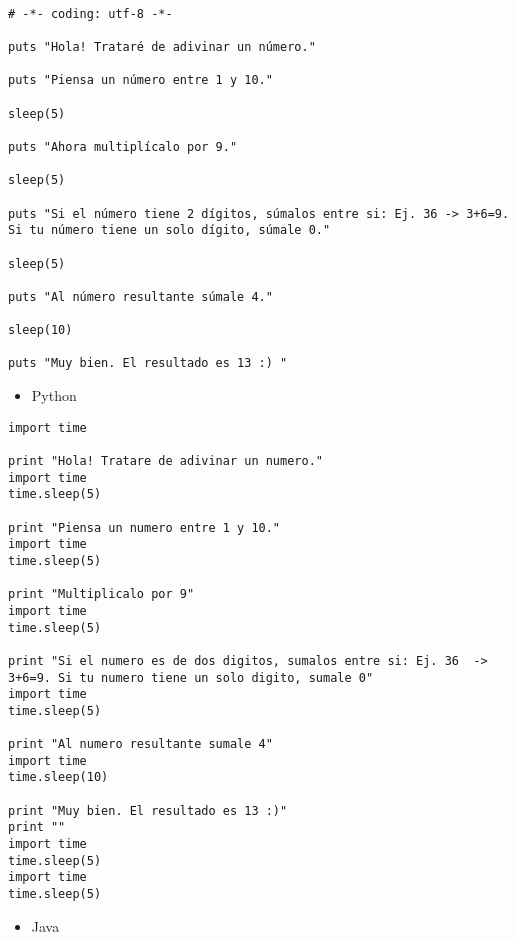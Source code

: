 \documentclass{article}
\begin{document}
\begin{verbatim}

# -*- coding: utf-8 -*-

puts "Hola! Trataré de adivinar un número."

puts "Piensa un número entre 1 y 10."

sleep(5)  

puts "Ahora multiplícalo por 9."

sleep(5)

puts "Si el número tiene 2 dígitos, súmalos entre si: Ej. 36 -> 3+6=9. Si tu número tiene un solo dígito, súmale 0."

sleep(5) 

puts "Al número resultante súmale 4."

sleep(10) 

puts "Muy bien. El resultado es 13 :) "

\end{verbatim}

\begin{itemize}
\item Python
\end{itemize}

\begin{verbatim}
import time

print "Hola! Tratare de adivinar un numero."
import time
time.sleep(5)

print "Piensa un numero entre 1 y 10."
import time
time.sleep(5)

print "Multiplicalo por 9"
import time
time.sleep(5)

print "Si el numero es de dos digitos, sumalos entre si: Ej. 36  -> 3+6=9. Si tu numero tiene un solo digito, sumale 0"
import time
time.sleep(5)

print "Al numero resultante sumale 4"
import time
time.sleep(10)

print "Muy bien. El resultado es 13 :)"
print ""
import time
time.sleep(5)
import time
time.sleep(5)

\end{verbatim}

\begin{itemize}
\item Java
\end{itemize}
\end{document}
